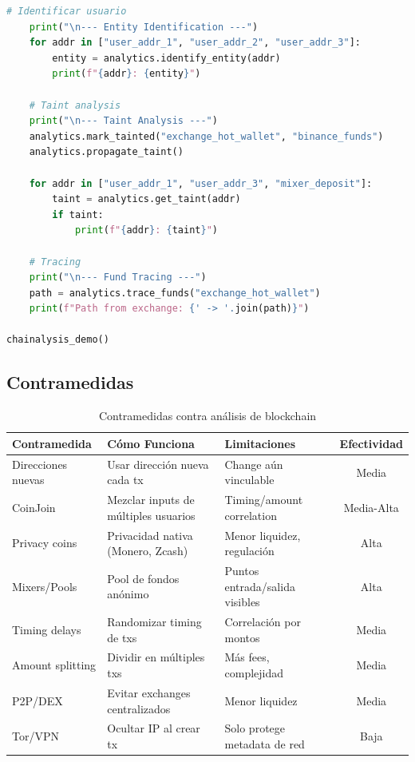 \documentclass[11pt,a4paper,twoside]{book}
\theoremstyle{definition}
\theoremstyle{remark}
\begin{document}
\begin{lstlisting}[language=Python, caption={Simulación de técnicas de Chainalysis}]
    # Identificar usuario
    print("\n--- Entity Identification ---")
    for addr in ["user_addr_1", "user_addr_2", "user_addr_3"]:
        entity = analytics.identify_entity(addr)
        print(f"{addr}: {entity}")
    
    # Taint analysis
    print("\n--- Taint Analysis ---")
    analytics.mark_tainted("exchange_hot_wallet", "binance_funds")
    analytics.propagate_taint()
    
    for addr in ["user_addr_1", "user_addr_3", "mixer_deposit"]:
        taint = analytics.get_taint(addr)
        if taint:
            print(f"{addr}: {taint}")
    
    # Tracing
    print("\n--- Fund Tracing ---")
    path = analytics.trace_funds("exchange_hot_wallet")
    print(f"Path from exchange: {' -> '.join(path)}")

chainalysis_demo()
\end{lstlisting}

\subsection{Contramedidas}

\begin{table}[htbp]
\centering
\small
\begin{tabular}{lp{4cm}p{4cm}c}
\toprule
\textbf{Contramedida} & \textbf{Cómo Funciona} & \textbf{Limitaciones} & \textbf{Efectividad} \\
\midrule
Direcciones nuevas & Usar dirección nueva cada tx & Change aún vinculable & Media \\
CoinJoin & Mezclar inputs de múltiples usuarios & Timing/amount correlation & Media-Alta \\
Privacy coins & Privacidad nativa (Monero, Zcash) & Menor liquidez, regulación & Alta \\
Mixers/Pools & Pool de fondos anónimo & Puntos entrada/salida visibles & Alta \\
Timing delays & Randomizar timing de txs & Correlación por montos & Media \\
Amount splitting & Dividir en múltiples txs & Más fees, complejidad & Media \\
P2P/DEX & Evitar exchanges centralizados & Menor liquidez & Media \\
Tor/VPN & Ocultar IP al crear tx & Solo protege metadata de red & Baja \\
\bottomrule
\end{tabular}
\caption{Contramedidas contra análisis de blockchain}
\end{table}
\end{document}
